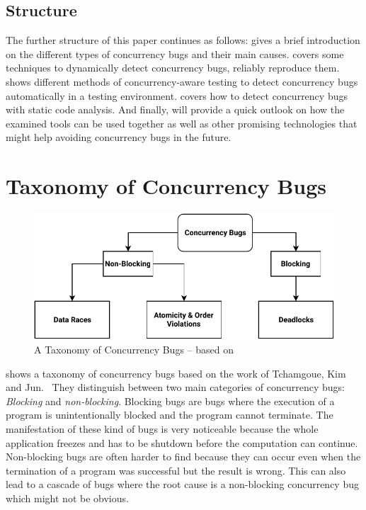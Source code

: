 \documentclass[conference]{IEEEtran}
\begin{document}
\subsection{Structure}

The further structure of this paper continues as follows:
 gives a brief introduction on the different types of concurrency bugs and their main causes.
 covers some techniques to dynamically detect concurrency bugs, reliably reproduce them.
 shows different methods of concurrency-aware testing to detect concurrency bugs automatically in a testing environment.
 covers how to detect concurrency bugs with static code analysis.
And finally,  will provide a quick outlook on how the examined tools can be used together as well as other promising technologies that might help avoiding concurrency bugs in the future.


\section{Taxonomy of Concurrency Bugs}
\label{sct:taxonomy}

\begin{figure}
    \includegraphics[width=\linewidth]{figures/ConcurrencyBugClasses.pdf}
    \caption{A Taxonomy of Concurrency Bugs -- based on\cite{tchamgoue2012testing}}
    \label{fig:classes}
\end{figure}

 shows a taxonomy of concurrency bugs based on the work of Tchamgoue, Kim and Jun.~\cite{tchamgoue2012testing}
They distinguish between two main categories of concurrency bugs: \emph{Blocking} and \emph{non-blocking}.
Blocking bugs are bugs where the execution of a program is unintentionally blocked and the program cannot terminate.
The manifestation of these kind of bugs is very noticeable because the whole application freezes and has to be shutdown before the computation can continue.
Non-blocking bugs are often harder to find because they can occur even when the termination of a program was successful but the result is wrong.
This can also lead to a cascade of bugs where the root cause is a non-blocking concurrency bug which might not be obvious.
\end{document}
